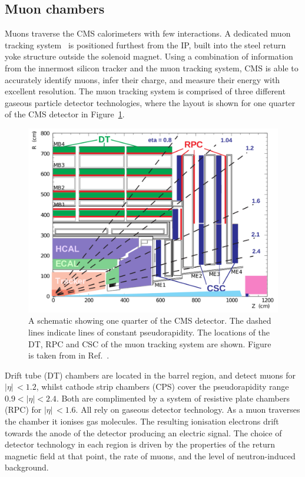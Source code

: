 \subsection{Muon chambers}\label{sec:cms_muon}
Muons traverse the CMS calorimeters with few interactions. A dedicated muon tracking system~\cite{Chatrchyan:2008zzk,Chatrchyan:2013sba} is positioned furthest from the IP, built into the steel return yoke structure outside the solenoid magnet. Using a combination of information from the innermost silicon tracker and the muon tracking system, CMS is able to accurately identify muons, infer their charge, and measure their energy with excellent resolution. The muon tracking system is comprised of three different gaseous particle detector technologies, where the layout is shown for one quarter of the CMS detector in Figure~\ref{fig:cms_muon}. 

\begin{figure}
  \centering
  \includegraphics[width=.6\textwidth]{Figures/cms/muon.pdf}
  \caption[The CMS muon chambers]
  {
    A schematic showing one quarter of the CMS detector. The dashed lines indicate lines of constant pseudorapidity. The locations of the DT, RPC and CSC of the muon tracking system are shown. Figure is taken from in Ref.~\cite{Chatrchyan:2012xi}.
  }
  \label{fig:cms_muon}
\end{figure}

Drift tube (DT) chambers are located in the barrel region, and detect muons for ${|\eta|\,<1.2}$, whilst cathode strip chambers (CPS) cover the pseudorapidity range $0.9<|\eta|<2.4$. Both are complimented by a system of resistive plate chambers (RPC) for ${|\eta|\,<1.6}$. All rely on gaseous detector technology. As a muon traverses the chamber it ionises gas molecules. The resulting ionisation electrons drift towards the anode of the detector producing an electric signal. The choice of detector technology in each region is driven by the properties of the return magnetic field at that point, the rate of muons, and the level of neutron-induced background.

